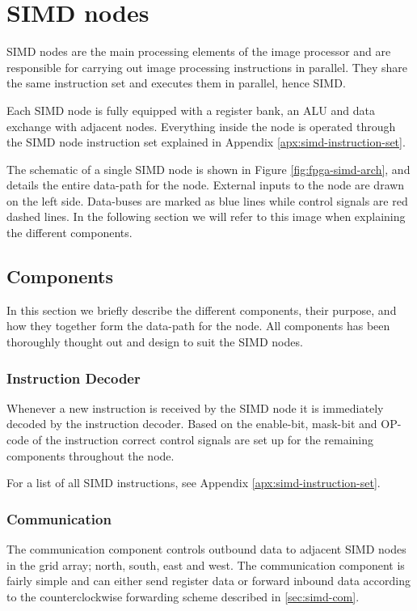 \section{SIMD nodes}

\ac{SIMD} nodes are the main processing elements of the image processor and are
responsible for carrying out image processing instructions in parallel. They
share the same instruction set and executes them in parallel, hence
\acf{SIMD}.

Each \ac{SIMD} node is fully equipped with a register bank,
an \ac{ALU} and data exchange with adjacent nodes.
Everything inside the node is operated through the SIMD node
instruction set explained in Appendix \ref{apx:simd-instruction-set}.

The schematic of a single \ac{SIMD} node is shown in Figure
\ref{fig:fpga-simd-arch}, and details the entire data-path for the
node. External inputs to the node are drawn on the left side. Data-buses are 
marked as blue lines while control signals are red dashed lines. In the 
following section we will refer to this image when explaining the different 
components.



\subsection{Components}
In this section we briefly describe the different components, their purpose, and
how they together form the data-path for the node. All components has been thoroughly
thought out and design to suit the \ac{SIMD} nodes.  

\subsubsection{Instruction Decoder}
Whenever a new instruction is received by the \ac{SIMD} node it is immediately 
decoded by the instruction decoder. Based on the enable-bit, mask-bit and OP-code
of the instruction correct control signals are set up for the remaining components
throughout the node.

For a list of all \ac{SIMD} instructions, see Appendix \ref{apx:simd-instruction-set}.

\subsubsection{Communication}
The communication component controls outbound data to adjacent \ac{SIMD} nodes in 
the grid array; north, south, east and west. The communication component is fairly 
simple and can either send register data or forward inbound data according to the 
counterclockwise forwarding scheme described in \ref{sec:simd-com}.

